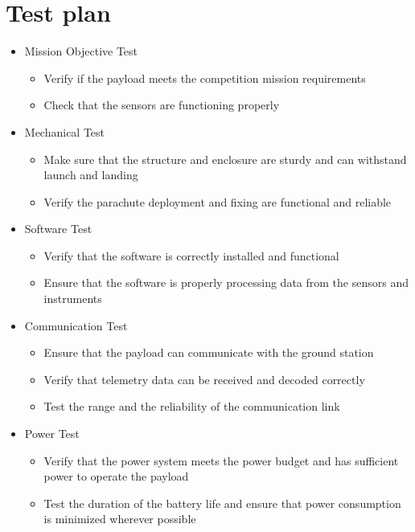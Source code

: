 \section{Test plan}\label{A1}

\begin{itemize}[leftmargin=1cm, itemindent=0.25cm, noitemsep, topsep=0pt, label=]
\item Mission Objective Test
\begin{itemize}[label=, noitemsep, topsep=2pt]
\item Verify if the payload meets the competition mission requirements
\item Check that the sensors are functioning properly
\end{itemize}

\item Mechanical Test
\begin{itemize}[label=, noitemsep, topsep=2pt]
\item Make sure that the structure and enclosure are sturdy and can withstand launch and landing
\item Verify the parachute deployment and fixing are functional and reliable
\end{itemize}

\item Software Test
\begin{itemize}[label=, noitemsep, topsep=2pt]
\item Verify that the software is correctly installed and functional
\item Ensure that the software is properly processing data from the sensors and instruments
\end{itemize}

\item Communication Test
\begin{itemize}[label=, noitemsep, topsep=2pt]
\item Ensure that the payload can communicate with the ground station
\item Verify that telemetry data can be received and decoded correctly
\item Test the range and the reliability of the communication link
\end{itemize}

\item Power Test
\begin{itemize}[label=, noitemsep, topsep=2pt]
\item Verify that the power system meets the power budget and has sufficient power to operate the payload
\item Test the duration of the battery life and ensure that power consumption is minimized wherever possible
\end{itemize}


\end{itemize}
